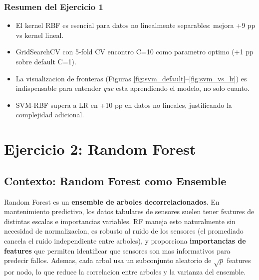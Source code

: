 \documentclass[12pt,a4paper]{article}
\begin{document}
\subsubsection*{Resumen del Ejercicio 1}

\begin{tcolorbox}[resultbox, title={Conclusiones Ejercicio 1 -- SVM}]
  \begin{itemize}
    \item El kernel RBF es esencial para datos no linealmente separables: mejora +9 pp vs kernel lineal.
    \item GridSearchCV con 5-fold CV encontro C=10 como parametro optimo (+1 pp sobre default C=1).
    \item La visualizacion de fronteras (Figuras \ref{fig:svm_default}--\ref{fig:svm_vs_lr}) es
      indispensable para entender \textit{que} esta aprendiendo el modelo, no solo cuanto.
    \item SVM-RBF supera a LR en +10 pp en datos no lineales, justificando la complejidad adicional.
  \end{itemize}
\end{tcolorbox}

\newpage

\section{Ejercicio 2: Random Forest}

\subsection{Contexto: Random Forest como Ensemble}

\begin{tcolorbox}[porquebox, title={Por que Random Forest para mantenimiento predictivo?}]
Random Forest es un \textbf{ensemble de arboles decorrelacionados}. En mantenimiento predictivo,
los datos tabulares de sensores suelen tener features de distintas escalas e importancias variables.
RF maneja esto naturalmente sin necesidad de normalizacion, es robusto al ruido de los sensores
(el promediado cancela el ruido independiente entre arboles), y proporciona \textbf{importancias
de features} que permiten identificar que sensores son mas informativos para predecir fallos.
Ademas, cada arbol usa un subconjunto aleatorio de $\sqrt{p}$ features por nodo, lo que reduce
la correlacion entre arboles y la varianza del ensemble.
\end{tcolorbox}
\end{document}

